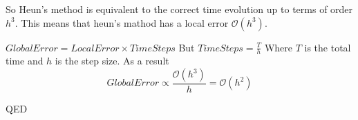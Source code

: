 So Heun's method is equivalent to the correct time evolution up to terms of order $h^3$. This means that heun's mathod has a local error $\mathcal{O}(h^3).$


$Global Error = LocalError\times TimeSteps$ But $TimeSteps = \frac{T}{h}$ Where $T$ is the total time and $h$ is the step size. 
As a result 
\begin{equation}
\label{eqn:taylor_2}
Global Error \propto \frac{\mathcal{O}(h^3)}{h} = \mathcal{O}(h^2)
\end{equation}

QED

